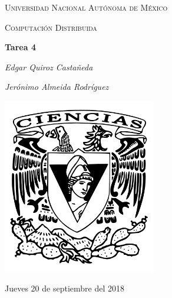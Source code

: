 \documentclass[12pt,a4paper]{report}
\begin{document}
\begin{titlepage}
	\centering
	{\scshape\LARGE Universidad Nacional Autónoma de México \par}
	\vspace{1cm}
	{\scshape\Large Computación Distribuida\par}
	\vspace{1.5cm}
	{\huge\bfseries Tarea 4\par}
	\vspace{.5cm}
	{\Large\itshape Edgar Quiroz Castañeda \par}
    \vspace{.5cm}
	{\Large\itshape Jerónimo Almeida Rodríguez \par}
	\vfill
	 \includegraphics[width=0.5\textwidth]{escudo_f-ciencias.png}
	\vfill

	{\large Jueves 20 de septiembre del 2018 \par}
\end{titlepage}

\pagebreak
\setlength{\voffset}{-0.75in}
\setlength{\headsep}{5pt}
\end{document}
